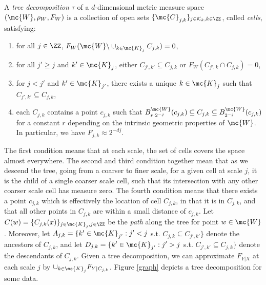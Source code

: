\begin{definition}\label{Def:tree} A \emph{tree decomposition} $\tau$ of a $d$-dimensional metric measure space $(\mc{W}, \rho_W, F_W)$ is a collection of open sets $\{\mc{C}_{j,k}\}_{j \in \mathcal{K}_k,k \in \ZZ}$, called \emph{cells}, satisfying:
\begin{enumerate}\itemsep0pt
	\item for all $j \in \ZZ$, $F_W(\mc{W} \backslash \cup_{k \in \mc{K}_j} C_{j,k} )=0$,
	\item for all $j' \geq j$ and $k' \in \mc{K}_j$, either $C_{j',k'} \subseteq C_{j,k}$ or $F_W(C_{j',k} \cap C_{j,k})=0$,
	\item for $j < j'$ and $k' \in \mc{K}_{j'}$, there exists a unique $k \in \mc{K}_j$ such that $C_{j',k'} \subseteq C_{j,k}$,
	\item each $C_{j,k}$ contains a point $c_{j,k}$ such that $B_{r \cdot 2^{-j}}^{\mc{W}}(c_{j,k}) \subseteq C_{j,k} \subseteq B_{2^{-j}}^{\mc{W}}(c_{j,k})$ for a constant $r$ depending on the intrinsic geometric properties of $\mc{W}$.  In particular, we have $F_{{j,k}} \approx 2^{-dj}$.
\end{enumerate}
\end{definition}
The first condition means that at each scale, the set of cells covers the space almost everywhere. The second and third condition together mean that as we descend the tree, going from a coarser to finer scale, for a given cell at scale $j$, it is the child of a single coarser scale cell, such that its intersection with any other coarser scale cell has measure zero. The fourth condition means that there exists a point $c_{j,k}$ which is effectively the location of cell $C_{j,k}$, in that it is in $C_{j,k}$, and that all other points in $C_{j,k}$ are within a small distance of $c_{j,k}$.  Let $C(w)=\{C_{j,k}(x)\}_{j \in \mc{K}_j, j \in \ZZ}$ be the \emph{path} along the tree for point $w \in \mc{W}$. Moreover, let $A_{j,k}=\{k' \in \mc{K}_{j'} : j' < j$ s.t. $C_{j,k} \subseteq C_{j',k'}\}$ denote the ancestors of $C_{j,k}$, and let $D_{j,k}=\{k' \in \mc{K}_{j'} : j' > j$ s.t. $C_{j',k'} \subseteq C_{j,k}\}$ denote the descendants of $C_{j,k}$.
% 
% 
% 
Given a tree decomposition, we can approximate $F_{Y|X}$ at each scale $j$ by $\cup_{k \in \mc{K}_j} F_{Y|C_{j,k}}$.  Figure \ref{graph} depicts a tree decomposition for some data.

